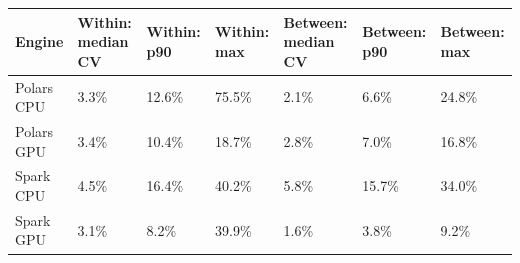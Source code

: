 \begin{tabular}{lllllll}
\toprule
Engine & Within: median CV & Within: p90 & Within: max & Between: median CV & Between: p90 & Between: max \\
\midrule
Polars CPU & 3.3\% & 12.6\% & 75.5\% & 2.1\% & 6.6\% & 24.8\% \\
Polars GPU & 3.4\% & 10.4\% & 18.7\% & 2.8\% & 7.0\% & 16.8\% \\
Spark CPU & 4.5\% & 16.4\% & 40.2\% & 5.8\% & 15.7\% & 34.0\% \\
Spark GPU & 3.1\% & 8.2\% & 39.9\% & 1.6\% & 3.8\% & 9.2\% \\
\bottomrule
\end{tabular}
